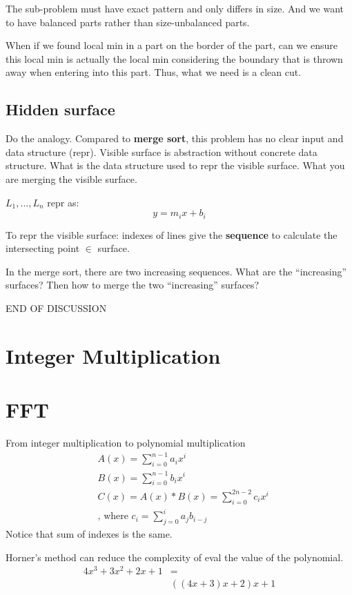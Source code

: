 \documentclass[a4paper]{report}
\begin{document}
The sub-problem must have exact pattern and only differs in size. And we want to have balanced parts rather than size-unbalanced parts. 

When if we found local min in a part on the border of the part, can we ensure this local min is actually the local min considering the boundary that is thrown away when entering into this part. Thus, what we need is a clean cut. 

\subsection*{Hidden surface}
Do the analogy. 
Compared to \textbf{merge sort}, this problem has no clear input and data structure (repr). Visible surface is abstraction without concrete data structure. What is the data structure used to repr the visible surface. What you are merging the visible surface. 

$L_1, ..., L_n$ repr as:
$$
y=m_ix+b_i
$$

To repr the visible surface: indexes of lines give the \textbf{sequence} to calculate the intersecting point $\in$ surface. 

In the merge sort, there are two increasing sequences. What are  the ``increasing'' surfaces? Then how to merge the two ``increasing'' surfaces?

END OF DISCUSSION

\section{Integer Multiplication}
\section{FFT}
From integer multiplication to polynomial multiplication 
\begin{align*}
& A(x) = \sum_{i=0}^{n-1} {a_i x^i}\\
& B(x) = \sum_{i=0}^{n-1} {b_i x^i}\\
& C(x) = A(x)*B(x) = \sum_{i=0}^{2n-2} {c_i x^i} \\
& \text{, where } c_i = \sum_{j=0}^i {a_j b_{i-j}}
\end{align*}
Notice that sum of indexes is the same.

Horner's method  can reduce the complexity of eval the value of the polynomial. 
\begin{align*}
4x^3+3x^2+2x+1 &=  \\
&((4x+3)x+2)x+1
\end{align*}
\end{document}

